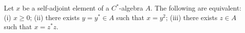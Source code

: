 Let $x$ be a self-adjoint element of a $C^*$-algebra $A$. The following are equivalent: (i) $x \geqslant 0$; (ii) there exists $y = y^* \in A$ such that $x = y^2$; (iii) there exists $z \in A$ such that $x = z^*z$.
